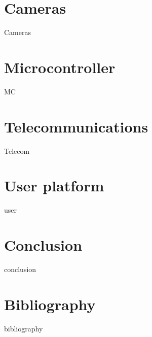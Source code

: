 \documentclass[parskip=full,11pt,a4paper,titlepage]{article}
\begin{document}
\section{Cameras}
{Cameras}
\clearpage

\section{Microcontroller}
{MC}
\clearpage

\section{Telecommunications}
{Telecom}
\clearpage

\section{User platform}
{user}

\section{Conclusion}
{conclusion}
\clearpage

\section{Bibliography}
{bibliography}












\end{document}
